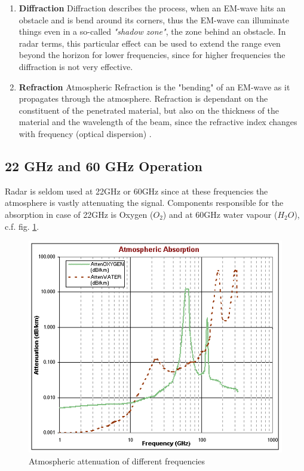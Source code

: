 \begin{enumerate}
	\item \textbf{Diffraction} \newline
			Diffraction describes the process, when an EM-wave hits an obstacle and is bend around its corners, thus the EM-wave can illuminate things even in a so-called \textit{"shadow zone"}, the zone behind an obstacle. In radar terms, this particular effect can be used to extend the range even beyond the horizon for lower frequencies, since for higher frequencies the diffraction is not very effective.
	\item \textbf{Refraction} \newline
			Atmospheric Refraction is the "bending" of an EM-wave as it propagates through the atmosphere. Refraction is dependant on the constituent of the penetrated material, but also on the thickness of the material and the wavelength of the beam, since the refractive index changes with frequency (optical dispersion) \citep{erickson:lecture}.
	
\end{enumerate}



\subsection{22 GHz and 60 GHz Operation}
Radar is seldom used at 22GHz or 60GHz since at these frequencies the atmosphere is vastly attenuating the signal. Components responsible for the absorption in case of 22GHz is Oxygen ($O_2$) and at 60GHz water vapour ($H_2O$), c.f. fig. \ref{fig:absorb}.
\begin{figure}[h!]
	\centering
	\includegraphics[width=0.7\linewidth]{images/absorbtion}
	\caption{Atmospheric attenuation of different frequencies \protect\footnotemark}	
	\label{fig:absorb}
\end{figure}



